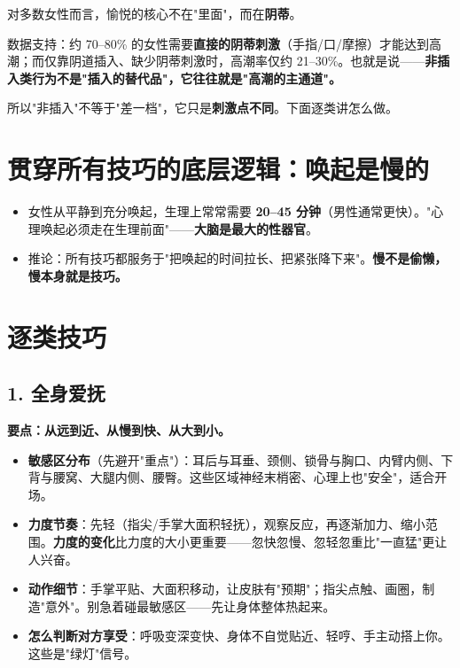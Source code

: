 \documentclass[12pt,UTF8,openany]{ctexbook}
\begin{document}
\begin{center}
\myhei\large 对多数女性而言，愉悦的核心不在"里面"，而在\textbf{阴蒂}。
\end{center}

数据支持：约 70--80\% 的女性需要\textbf{直接的阴蒂刺激}（手指/口/摩擦）才能达到高潮；而仅靠阴道插入、缺少阴蒂刺激时，高潮率仅约 21--30\%。也就是说——\textbf{非插入类行为不是"插入的替代品"，它往往就是"高潮的主通道"。}

所以"非插入"不等于"差一档"，它只是\textbf{刺激点不同}。下面逐类讲怎么做。

\section{贯穿所有技巧的底层逻辑：唤起是慢的}

\begin{itemize}[leftmargin=2em,itemsep=0.3em]
  \item 女性从平静到充分唤起，生理上常常需要 \textbf{20--45 分钟}（男性通常更快）。"心理唤起必须走在生理前面"——\textbf{大脑是最大的性器官}。
  \item 推论：所有技巧都服务于"把唤起的时间拉长、把紧张降下来"。\textbf{慢不是偷懒，慢本身就是技巧。}
\end{itemize}

\section{逐类技巧}

\subsection*{1. 全身爱抚}

\textbf{要点：从远到近、从慢到快、从大到小。}

\begin{itemize}[leftmargin=2em,itemsep=0.3em]
  \item \textbf{敏感区分布}（先避开"重点"）：耳后与耳垂、颈侧、锁骨与胸口、内臂内侧、下背与腰窝、大腿内侧、腰臀。这些区域神经末梢密、心理上也"安全"，适合开场。
  \item \textbf{力度节奏}：先轻（指尖/手掌大面积轻抚），观察反应，再逐渐加力、缩小范围。\textbf{力度的变化}比力度的大小更重要——忽快忽慢、忽轻忽重比"一直猛"更让人兴奋。
  \item \textbf{动作细节}：手掌平贴、大面积移动，让皮肤有"预期"；指尖点触、画圈，制造"意外"。别急着碰最敏感区——先让身体整体热起来。
  \item \textbf{怎么判断对方享受}：呼吸变深变快、身体不自觉贴近、轻哼、手主动搭上你。这些是"绿灯"信号。
\end{itemize}
\end{document}
